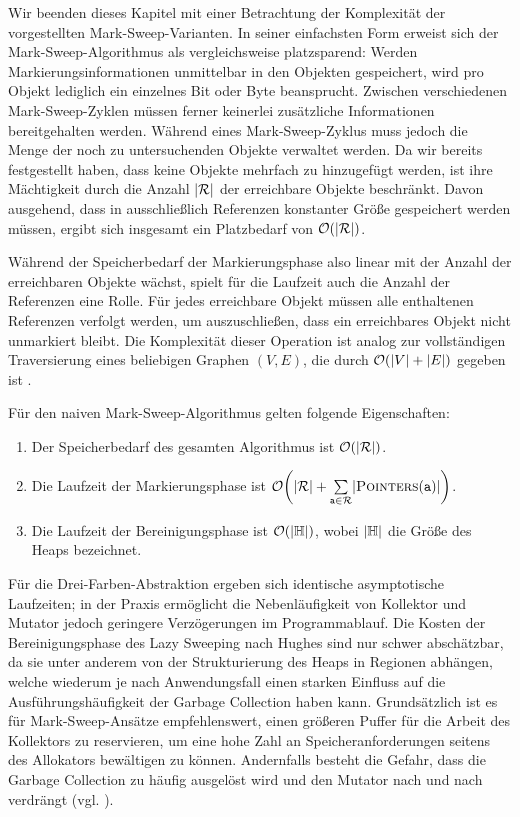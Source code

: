 Wir beenden dieses Kapitel mit einer Betrachtung der Komplexität der vorgestellten Mark-Sweep-Varianten.
In seiner einfachsten Form erweist sich der Mark-Sweep-Algorithmus als vergleichsweise platzsparend:
Werden Markierungsinformationen unmittelbar in den Objekten gespeichert, wird pro Objekt lediglich ein einzelnes Bit oder Byte beansprucht.
Zwischen verschiedenen Mark-Sweep-Zyklen müssen ferner keinerlei zusätzliche Informationen bereitgehalten werden.
Während eines Mark-Sweep-Zyklus muss jedoch die Menge  der noch zu untersuchenden Objekte verwaltet werden.
Da wir bereits festgestellt haben, dass keine Objekte mehrfach zu  hinzugefügt werden, ist ihre Mächtigkeit durch die Anzahl $|\mathcal{R}|$ der erreichbare Objekte beschränkt.
Davon ausgehend, dass in  ausschließlich Referenzen konstanter Größe gespeichert werden müssen, ergibt sich insgesamt ein Platzbedarf von $\mathcal{O}(|\mathcal{R}|)$.

Während der Speicherbedarf der Markierungsphase also linear mit der Anzahl der erreichbaren Objekte wächst, spielt für die Laufzeit auch die Anzahl der Referenzen eine Rolle.
Für jedes erreichbare Objekt müssen alle enthaltenen Referenzen verfolgt werden, um auszuschließen, dass ein erreichbares Objekt nicht unmarkiert bleibt.
Die Komplexität dieser Operation ist analog zur vollständigen Traversierung eines beliebigen Graphen $(V,E)$, die durch $\mathcal{O}(|V|+|E|)$ gegeben ist \cite[Kap. 22]{cormen-leiserson}.

\begin{mybox}
\begin{satz}
	Für den naiven Mark-Sweep-Algorithmus gelten folgende Eigenschaften:
	\begin{enumerate}[(1)]
		\item Der Speicherbedarf des gesamten Algorithmus ist $\mathcal{O}(|\mathcal{R}|)$.
		\item Die Laufzeit der Markierungsphase ist $\oh\enb{|\Reach|+\sum\limits_{\Var{a} \in \Reach}^{} \abs{\Pointers(\Var{a})}}$.
		\item Die Laufzeit der Bereinigungsphase ist $\mathcal{O}(|\mathbb{H}|)$, wobei $|\mathbb{H}|$ die Größe des Heaps bezeichnet.
	\end{enumerate}
\end{satz}
\end{mybox}

Für die Drei-Farben-Abstraktion ergeben sich identische asymptotische Laufzeiten; in der Praxis ermöglicht die Nebenläufigkeit von Kollektor und Mutator jedoch geringere Verzögerungen im Programmablauf.
Die Kosten der Bereinigungsphase des Lazy Sweeping nach Hughes sind nur schwer abschätzbar, da sie unter anderem von der Strukturierung des Heaps in Regionen abhängen, welche wiederum je nach Anwendungsfall einen starken Einfluss auf die Ausführungshäufigkeit der Garbage Collection haben kann.
Grundsätzlich ist es für Mark-Sweep-Ansätze empfehlenswert, einen größeren Puffer für die Arbeit des Kollektors zu reservieren, um eine hohe Zahl an Speicheranforderungen seitens des Allokators bewältigen zu können.
Andernfalls besteht die Gefahr, dass die Garbage Collection zu häufig ausgelöst wird und den Mutator nach und nach verdrängt (vgl. \cite[S. 70]{jones-lins}).